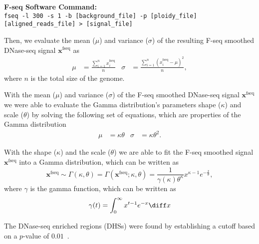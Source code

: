 \vspace{0.3cm}
\noindent
\textbf{F-seq Software Command:}\\
\texttt{fseq -l 300 -s 1 -b [background\_file] -p [ploidy\_file] [aligned\_reads\_file] > [signal\_file]}
\vspace{0.3cm}

Then, we evaluate the mean ($\mu$) and variance ($\sigma$) of the resulting F-seq smoothed DNase-seq signal $\mathbf{x}^{\text{fseq}}$ as
\begin{align}
  \label{eq:fseq.mean.std}
  \mu &= \frac{\sum_{i=1}^{n} x^{\text{fseq}}_{i}}{n} &
  \sigma &= \frac{ \sum_{i=1}^{n} \left( x^{\text{fseq}}_{i} - \mu \right)^2}{n},
\end{align}
where $n$ is the total size of the genome.

With the mean ($\mu$) and variance ($\sigma$) of the F-seq smoothed DNase-seq signal $\mathbf{x}^{\text{fseq}}$ we were able to evaluate the Gamma distribution's parameters shape ($\kappa$) and scale ($\theta$) by solving the following set of equations, which are properties of the Gamma distribution
\begin{align}
  \label{eq:fseq.shape.scale}
  \mu &= \kappa \theta &
  \sigma &= \kappa {\theta}^{2}.
\end{align}

With the shape ($\kappa$) and the scale ($\theta$) we are able to fit the F-seq smoothed signal $\mathbf{x}^{\text{fseq}}$ into a Gamma distribution, which can be written as
\begin{equation}
  \label{eq:gamma.distribution}
  \mathbf{x}^{\text{fseq}} \sim \Gamma(\kappa,\theta) = \Gamma(\mathbf{x}^{\text{fseq}}; \kappa,\theta) = 
  \frac{1}{\gamma(\kappa) {\theta}^{\kappa}} {x}^{\kappa-1} {e}^{-\frac{x}{\theta}},
\end{equation}
where $\gamma$ is the gamma function, which can be written as
\begin{equation}
  \label{eq:gamma.function}
  \gamma(t) = \int_{0}^{\infty} {x}^{t-1} {e}^{-x} \diff x
\end{equation}

The DNase-seq enriched regions (DHSs) were found by establishing a cutoff based on a $p$-value of $0.01$~\cite{boyle2008b,encode2012}.

